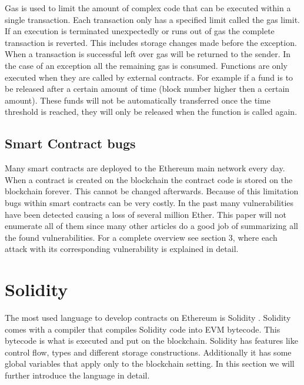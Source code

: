 \documentclass[a4paper]{article}
\begin{document}
Gas is used to limit the amount of complex code that can be executed within a single transaction. Each transaction only has a specified limit called the gas limit. If an execution is terminated unexpectedly or runs out of gas the complete transaction is reverted. This includes storage changes made before the exception. When a transaction is successful left over gas will be returned to the sender. In the case of an exception all the remaining gas is consumed.
Functions are only executed when they are called by external contracts. For example if a fund is to be released after a certain amount of time (block number higher then a certain amount). These funds will not be automatically transferred once the time threshold is reached, they will only be released when the function is called again.\\

\subsection{Smart Contract bugs}
Many smart contracts are deployed to the Ethereum main network every day. When a contract is created on the blockchain the contract code is stored on the blockchain forever. This cannot be changed afterwards. Because of this limitation bugs within smart contracts can be very costly. In the past many vulnerabilities have been detected causing a loss of several million Ether. This paper will not enumerate all of them since many other articles do a good job of summarizing all the found vulnerabilities. For a complete overview see \cite{dika2017ethereum} section 3, where each attack with its corresponding vulnerability is explained in detail.

\section{Solidity}
\label{sec:solidity}
The most used language to develop contracts on Ethereum is Solidity \cite{solidityreadthedocs}. Solidity comes with a compiler that compiles Solidity code into EVM bytecode. This bytecode is what is executed and put on the blockchain. Solidity has features like control flow, types and different storage constructions. Additionally it has some global variables that apply only to the blockchain setting. In this section we will further introduce the language in detail.
\end{document}
